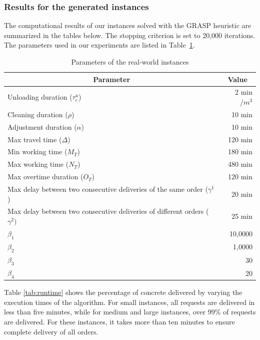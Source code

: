 \documentclass{article}
\begin{document}
\subsubsection{Results for the generated instances}

The computational results of our instances solved with the GRASP heuristic are summarized in the tables below. The stopping criterion is set to 20,000 iterations. The parameters used in our experiments are listed in Table~\ref*{tab:problem_parameters}.


\begin{table}[hbt]
    \centering
    \caption{Parameters of the real-world instances}
    \label{tab:problem_parameters}
    \small
    \begin{tabularx}{\textwidth}{Xr}
        \toprule
        \multicolumn{1}{c}{Parameter} & \multicolumn{1}{c}{Value} \\ \midrule
        Unloading duration ($\tau_c^u$) & 2 min$/m^3$ \\
        Cleaning duration ($\rho$) & 10 min \\
        Adjustment duration ($\alpha$) & 10 min \\
        Max travel time ($\Delta$) & 120 min \\
        Min working time ($M_T$) & 180 min \\
        Max working time ($N_T$) & 480 min \\
        Max overtime duration ($O_T$) & 120 min \\
        Max delay between two consecutive deliveries of the same order ($\gamma^1$) & 20 min \\
        Max delay between two consecutive deliveries of different orders ($\gamma^2)$ & 25 min \\
       $\beta_1$ & 10,0000  \\
       $\beta_2$ & 1,0000  \\
       $\beta_3$ & 30  \\
       $\beta_4$ & 20  \\
        \bottomrule
    \end{tabularx}
\end{table}

Table \ref*{tab:runtime} shows the percentage of concrete delivered by varying the execution times of the algorithm. For small instances, all requests are delivered in less than five minutes, while for medium and large instances, over 99\% of requests are delivered.  For these instances, it takes more than ten minutes to ensure complete delivery of all orders.
\end{document}

